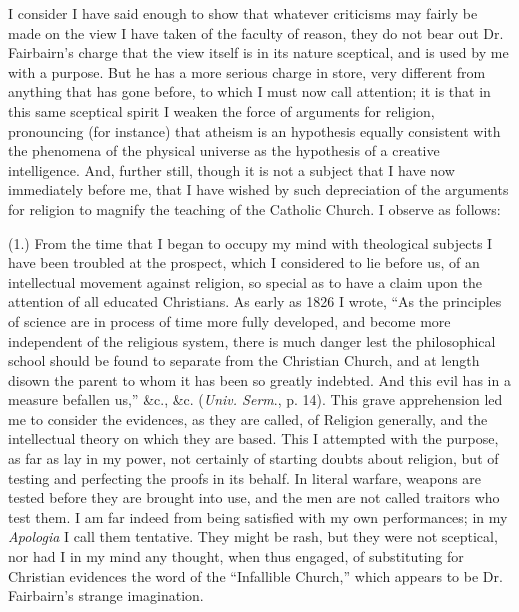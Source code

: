 
I consider I have said enough to show that
whatever criticisms may fairly be made on the view I have taken of the
faculty of reason, they do not bear out Dr. Fairbairn's charge that
the view itself is in its nature sceptical, and is used by me with a
purpose. But he has a more serious charge in store, very different
from anything that has gone before, to which I must now call
attention; it is that in this same sceptical spirit I weaken the force
of arguments for religion, pronouncing (for instance) that atheism is
an hypothesis equally consistent with the phenomena of the physical
universe as the hypothesis of a creative intelligence. And, further
still, though it is not a subject that I have now immediately before
me, that I have wished by such depreciation of the arguments for
religion to magnify the teaching of the Catholic Church. I observe as
follows:

(1.) From the time that I began to occupy my mind
with theological subjects I have been troubled at the prospect, which
I considered to lie before us, of an intellectual movement against
religion, so special as to have a claim upon the attention of all
educated Christians. As early as 1826 I wrote, ``As the principles of
science are in process of time more fully developed, and become more
independent of the religious system, there is much danger lest the
philosophical school should be found to separate from the Christian
Church, and at length disown the parent to whom it has been so greatly
indebted. And this evil has in a measure befallen us,'' \&c.,
\&c. (\emph{Univ. Serm}., p. 14).
This grave apprehension led me to consider the evidences, as they are
called, of Religion generally, and the intellectual theory on which
they are based. This I attempted with the purpose, as far as lay in my
power, not certainly of starting doubts about religion, but of testing
and perfecting the proofs in its behalf. In literal warfare, weapons
are tested before they are brought into use, and the men are not
called traitors who test them. I am far indeed from being satisfied
with my own performances; in my \emph{Apologia}
I call them tentative. They might be rash, but they were not sceptical,
nor had I in my mind any thought, when thus engaged, of substituting
for Christian evidences the word of the ``Infallible Church,''
which appears to be Dr. Fairbairn's strange imagination.

